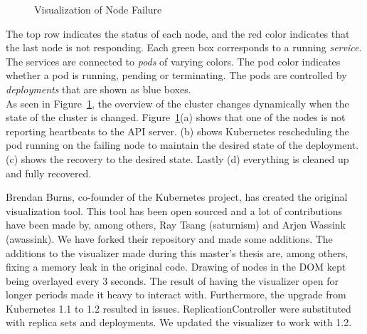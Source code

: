 \begin{figure}[H]
          \qquad
    \caption{Visualization of Node Failure}%
    \label{fig:visualizer_node_failure}%
\end{figure}

\noindent 
The top row indicates the status of each node, and the red color indicates that the last node is not responding. Each green box corresponds to a running \textit{service}. The services are connected to \textit{pods} of varying colors. The pod color indicates whether a pod is running, pending or terminating. The pods are controlled by \textit{deployments} that are shown as blue boxes. \\
As seen in Figure~\ref{fig:visualizer_node_failure}, the overview of the cluster changes dynamically when the state of the cluster is changed. Figure~\ref{fig:visualizer_node_failure}(a) shows that one of the nodes is not reporting heartbeats to the API server. (b) shows Kubernetes rescheduling the pod running on the failing node to maintain the desired state of the deployment. (c) shows the recovery to the desired state. Lastly (d) everything is cleaned up and fully recovered.

\noindent
Brendan Burns, co-founder of the Kubernetes project, has created the original visualization tool. This tool has been open sourced and a lot of contributions have been made by, among others, Ray Tsang (saturnism) and Arjen Wassink (awassink). We have forked their repository and made some additions. The additions to the visualizer made during this master's thesis are, among others, fixing a memory leak in the original code. Drawing of nodes in the DOM kept being overlayed every 3 seconds. The result of having the visualizer open for longer periods made it heavy to interact with. Furthermore, the upgrade from Kubernetes 1.1 to 1.2 resulted in issues. ReplicationController were substituted with replica sets and deployments. We updated the visualizer to work with 1.2.